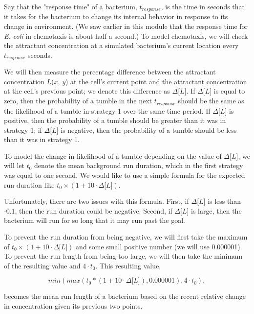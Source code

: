 Say that the "response time" of a bacterium, $t_{response}$, is the time in seconds that it takes for the bacterium to change its internal behavior in response to its change in environment. (We saw earlier in this module that the response time for \textit{E. coli} in chemotaxis is about half a second.) To model chemotaxis, we will check the attractant concentration at a simulated bacterium's current location every $t_{response}$ seconds.

We will then measure the percentage difference between the attractant concentration $L$($x$, $y$) at the cell's current point and the attractant concentration at the cell's previous point; we denote this difference as $\Delta\text{[}L{]}$. If $\Delta\text{[}L{]}$ is equal to zero, then the probability of a tumble in the next $t_{response}$ should be the same as the likelihood of a tumble in strategy 1 over the same time period. If $\Delta\text{[}L{]}$ is positive, then the probability of a tumble should be greater than it was in strategy 1; if $\Delta\text{[}L{]}$ is negative, then the probability of a tumble should be less than it was in strategy 1.

To model the change in likelihood of a tumble depending on the value of $\Delta\text{[}L{]}$, we will let $t_0$ denote the mean background run duration, which in the first strategy was equal to one second. We would like to use a simple formula for the expected run duration like $t_0 \times (1 + 10 · \Delta\text{[}L{]})$.

Unfortunately, there are two issues with this formula. First, if $\Delta\text{[}L{]}$ is less than -0.1, then the run duration could be negative. Second, if $\Delta\text{[}L{]}$ is large, then the bacterium will run for so long that it may run past the goal.

To prevent the run duration from being negative, we will first take the maximum of $t_0 \times (1 + 10 · \Delta\text{[}L{]})$ and some small positive number (we will use 0.000001). To prevent the run length from being too large, we will then take the minimum of the resulting value and $4 \cdot t_0$. This resulting value,

$$min(max(t_0 * (1 + 10 \cdot \Delta\text{[}L{]}), 0.000001), 4 \cdot t_0),$$

becomes the mean run length of a bacterium based on the recent relative change in concentration given its previous two points.

\begin{qbox}\end{qbox}

